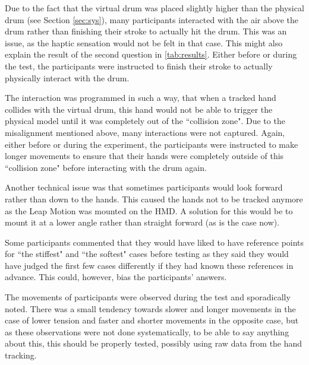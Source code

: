 \documentclass{article}
\begin{document}
Due to the fact that the virtual drum was placed slightly higher than the physical drum (see Section \ref{sec:sys}), many participants interacted with the air above the drum rather than finishing their stroke to actually hit the drum. This was an issue, as the haptic sensation would not be felt in that case. This might also explain the result of the second question in \autoref{tab:results}. Either before or during the test, the participants were instructed to finish their stroke to actually physically interact with the drum. 

The interaction was programmed in such a way, that when a tracked hand collides with the virtual drum, this hand would not be able to trigger the physical model until it was completely out of the ``collision zone". Due to the misalignment mentioned above, many interactions were not captured. Again, either before or during the experiment, the participants were instructed to make longer movements to ensure that their hands were completely outside of this ``collision zone" before interacting with the drum again.

Another technical issue was that sometimes participants would look forward rather than down to the hands. This caused the hands not to be tracked anymore as the Leap Motion was mounted on the HMD. A solution for this would be to mount it at a lower angle rather than straight forward (as is the case now).

Some participants commented that they would have liked to have reference points for ``the stiffest" and ``the softest" cases before testing as they said they would have judged the first few cases differently if they had known these references in advance. This could, however, bias the participants' answers.

The movements of participants were observed during the test and sporadically noted. There was a small tendency towards slower and longer movements in the case of lower tension and faster and shorter movements in the opposite case, but as these observations were not done systematically, to be able to say anything about this, this should be properly tested, possibly using raw data from the hand tracking.

\end{document}
